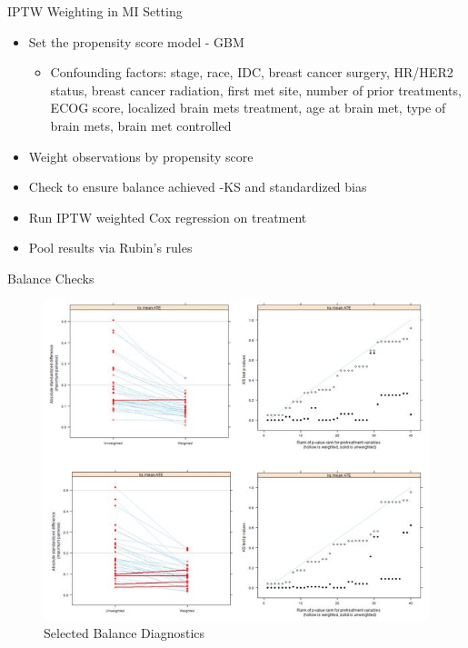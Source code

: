 \begin{frame}{IPTW Weighting in MI Setting}
\begin{itemize}
 \item Set the propensity score model - GBM
 \begin{itemize}
  \item Confounding factors: stage, race, IDC, breast cancer surgery, HR/HER2 status,
  breast cancer radiation, first met site, number of prior treatments, ECOG score,
  localized brain mets treatment, age at brain met, type of brain mets, brain met controlled
 \end{itemize}

 \item Weight observations by propensity score
 \item Check to ensure balance achieved -KS and standardized bias
 \item Run IPTW weighted Cox regression on treatment
 \item Pool results via Rubin's rules
\end{itemize} 
\end{frame}


\begin{frame}{Balance Checks}
  \begin{figure}[h!]
  \centering
\includegraphics[width=.8\textwidth]{balance_diagnosis} 
  \caption{Selected Balance Diagnostics}
\label{fig:balcheck}
\end{figure}

\end{frame}

